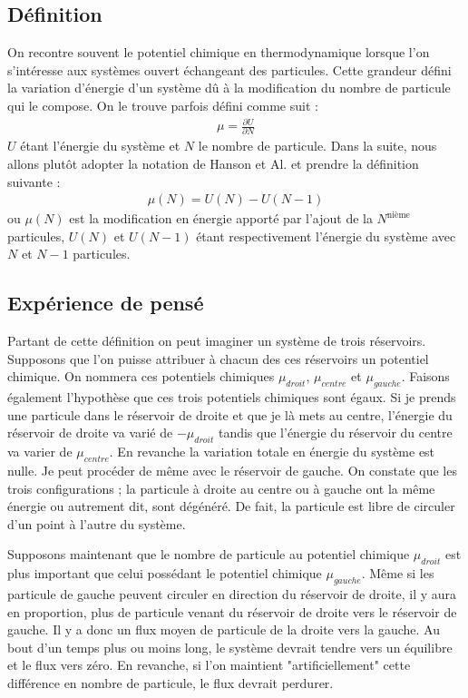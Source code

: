 \subsection{Définition}

On recontre souvent le potentiel chimique en thermodynamique lorsque l'on s'intéresse aux systèmes ouvert échangeant des particules. Cette grandeur défini la variation d'énergie d'un système d\^u à la modification du nombre de particule qui le compose. On le trouve parfois défini comme suit :
\begin{eqnarray}
\mu = \frac{\partial U}{\partial N} \nonumber
\end{eqnarray}
$U$ étant l'énergie du système et $N$ le nombre de particule. Dans la suite, nous allons plut\^ot adopter la notation de Hanson et Al. et prendre la définition suivante :
\begin{eqnarray}
\mu(N) = U(N) - U(N-1)
\end{eqnarray}
ou $\mu(N)$ est la modification en énergie apporté par l'ajout de la $N^\text{nième}$ particules, $U(N)$ et $U(N-1)$ étant respectivement l'énergie du système avec $N$ et $N-1$ particules.

\subsection{Expérience de pensé}
Partant de cette définition on peut imaginer un système de trois réservoirs. Supposons que l'on puisse attribuer à chacun des ces réservoirs un potentiel chimique. On nommera ces potentiels chimiques $\mu_{droit}$, $\mu_{centre}$ et $\mu_{gauche}$. Faisons également l'hypothèse que ces trois potentiels chimiques sont égaux. Si je prends une particule dans le réservoir de droite et que je là mets au centre, l'énergie du réservoir de droite va varié de $-\mu_{droit}$ tandis que l'énergie du réservoir du centre va varier de $\mu_{centre}$. En revanche la variation totale en énergie du système est nulle. Je peut procéder de m\^eme avec le réservoir de gauche. On constate que les trois configurations ; la particule à droite au centre ou à gauche ont la m\^eme énergie ou autrement dit, sont dégénéré. De fait, la particule est libre de circuler d'un point à l'autre du système. 


Supposons maintenant que le nombre de particule au potentiel chimique $\mu_{droit}$ est plus important que celui possédant le potentiel chimique $\mu_{gauche}$. M\^eme si les particule de gauche peuvent circuler en direction du réservoir de droite, il y aura en proportion, plus de particule venant du réservoir de droite vers le réservoir de gauche. Il y a donc un flux moyen de particule de la droite vers la gauche. Au bout d'un temps plus ou moins long, le système devrait tendre vers un équilibre et le flux vers zéro. En revanche, si l'on maintient "artificiellement" cette différence en nombre de particule, le flux devrait perdurer.

